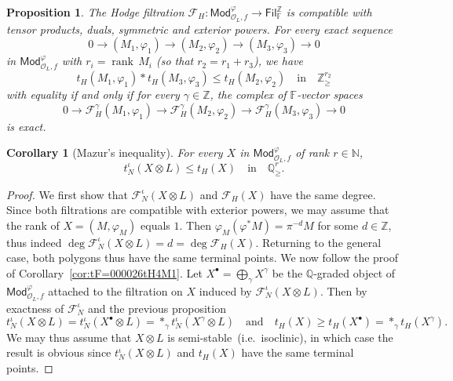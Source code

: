 \documentclass[11pt]{article}
\newtheorem{prop}[theo]{Proposition}
\newtheorem{coro}[theo]{Corollary}
\theoremstyle{definition}
\numberwithin{equation}{section}
\numberwithin{figure}{section}
\numberwithin{table}{section}
\newcommand{\Mod}{\mathsf{Mod}}
\newcommand{\Fil}{\mathsf{Fil}}
\DeclareMathOperator{\rank}{rank}
\begin{document}
\begin{prop}\label{prop:HodgeonO_L}
The Hodge filtration $\mathcal{F}_{H}:\Mod_{\mathcal{O}_{L},f}^{\varphi}\rightarrow\Fil_{\mathbb{F}}^{\mathbb{Z}}$ is compatible with tensor products, duals, symmetric and exterior powers. For every exact sequence
\[
0\rightarrow(M_{1},\varphi_{1})\rightarrow(M_{2},\varphi_{2})\rightarrow(M_{3},\varphi_{3})\rightarrow0
\]
in $\Mod_{\mathcal{O}_{L},f}^{\varphi}$ with $r_{i}=\rank\,M_{i}$ (so that $r_{2}=r_{1}+r_{3}$), we have
\[
t_{H}(M_{1},\varphi_{1})\ast t_{H}(M_{3},\varphi_{3})\leq t_{H}(M_{2},\varphi_{2})\quad\text{in}\quad\mathbb{Z}_{\geq}^{r_{2}}
\]
with equality if and only if for every $\gamma\in\mathbb{Z}$, the complex of $\mathbb{F}$-vector spaces
\[
0\rightarrow\mathcal{F}_{H}^{\gamma}(M_{1},\varphi_{1})\rightarrow\mathcal{F}_{H}^{\gamma}(M_{2},\varphi_{2})\rightarrow\mathcal{F}_{H}^{\gamma}(M_{3},\varphi_{3})\rightarrow0
\]
is exact.
\end{prop}

\begin{coro}[Mazur's inequality]\label{cor:Mazurinequality}
For every $X$ in $\Mod_{\mathcal{O}_{L},f}^{\varphi}$ of rank $r\in\mathbb{N}$,
\[
t_{N}^{\iota}(X\otimes L)\leq t_{H}(X)\quad\text{in}\quad\mathbb{Q}_{\geq}^{r}.
\]
\end{coro}

\begin{proof}
We first show that $\mathcal{F}_{N}^{\iota}(X\otimes L)$ and $\mathcal{F}_{H}(X)$ have the same degree. Since both filtrations are compatible with exterior powers, we may assume that the rank of $X=(M,\varphi_{M})$ equals $1$. Then $\varphi_{M}(\varphi^{\ast}M)=\pi^{-d}M$ for some $d\in\mathbb{Z}$, thus indeed $\deg\mathcal{F}_{N}^{\iota}(X\otimes L)=d=\deg\mathcal{F}_{H}(X)$. Returning to the general case, both polygons thus have the same terminal points. We now follow the proof of Corollary~\ref{cor:tF=000026tH4M1}. Let $X^{\bullet}=\bigoplus_{\gamma}X^{\gamma}$ be the $\mathbb{Q}$-graded object of $\Mod_{\mathcal{O}_{L},f}^{\varphi}$ attached to the filtration on $X$ induced by $\mathcal{F}_{N}^{\iota}(X\otimes L)$. Then by exactness of $\mathcal{F}_{N}^{\iota}$ and the previous proposition
\[
t_{N}^{\iota}(X\otimes L)=t_{N}^{\iota}(X^{\bullet}\otimes L)=\ast_{\gamma}t_{N}^{\iota}(X^{\gamma}\otimes L)\quad\text{and}\quad t_{H}(X)\geq t_{H}(X^{\bullet})=\ast_{\gamma}t_{H}(X^{\gamma}).
\]
We may thus assume that $X\otimes L$ is semi-stable~(i.e.~isoclinic), in which case the result is obvious since $t_{N}^{\iota}(X\otimes L)$ and $t_{H}(X)$ have the same terminal points.
\end{proof}
\end{document}
